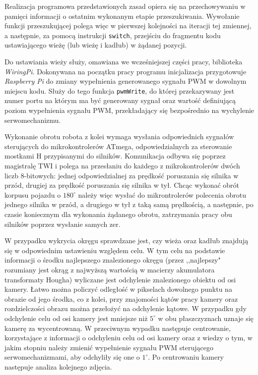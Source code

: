 Realizacja programowa przedstawionych zasad opiera się na przechowywaniu w pamięci informacji o ostatnim wykonanym etapie przeszukiwania. Wywołanie funkcji przeszukującej polega więc w pierwszej kolejności na iteracji tej zmiennej, a następnie, za pomocą instrukcji \texttt{switch}, przejściu do fragmentu kodu ustawiającego wieżę (lub wieżę i kadłub) w żądanej pozycji.

Do ustawiania wieży służy, omawiana we wcześniejszej części pracy, biblioteka \textit{WiringPi}. Dokonywana na początku pracy programu inicjalizacja przygotowuje \textit{Raspberry Pi} do zmiany wypełnienia generowanego sygnału PWM w dowolnym miejscu kodu.  Służy do tego funkcja \texttt{pwmWrite}, do której przekazywany jest numer portu na którym ma być generowany sygnał oraz wartość definiującą poziom wypełnienia sygnału PWM, przekładający się bezpośrednio na wychylenie serwomechanizmu.

Wykonanie obrotu robota z kolei wymaga wysłania odpowiednich sygnałów sterujących do mikrokontrolerów ATmega, odpowiedzialnych za sterowanie mostkami H przypisanymi do silników. Komunikacja odbywa się poprzez magistralę TWI i polega na przesłaniu do każdego z mikrokontrolerów dwóch liczb 8-bitowych: jednej odpowiedzialnej za prędkość poruszania się silnika w przód, drugiej za prędkość poruszania się silnika w tył. Chcąc wykonać obrót korpusu pojazdu o $180^\circ$ należy więc wysłać do mikrontrolerów polecenia obrotu jednego silnika w przód, a drugiego w tył z taką samą prędkością, a następnie, po czasie koniecznym dla wykonania żądanego obrotu, zatrzymania pracy obu silników poprzez wysłanie samych zer.

W przypadku wykrycia okręgu sprawdzane jest, czy wieża oraz kadłub znajdują się w odpowiednim ustawieniu względem celu. W tym celu na podstawie informacji o środku najlepszego znalezionego okręgu (przez ,,najlepszy" rozumiany jest okrąg z najwyższą wartością w macierzy akumulatora transformaty Hougha) wyliczane jest odchylenie znalezionego obiektu od osi kamery. Łatwo można policzyć odległość w pikselach dowolnego punktu na obrazie od jego środka, co z kolei, przy znajomości kątów pracy kamery oraz rozdzielczości obrazu można przełożyć na odchylenie kątowe. W przypadku gdy odchylenie celu od osi kamery jest mniejsze niż $5^\circ$ w obu płaszczyznach uznaje się kamerę za wycentrowaną. W przeciwnym wypadku następuje centrowanie, korzystające z informacji o odchyleniu celu od osi kamery oraz z wiedzy o tym, w jakim stopniu należy zmienić wypełnienie sygnału PWM sterującego serwomechanizmami, aby odchyliły się one o $1^\circ$. Po centrowaniu kamery następuje analiza kolejnego zdjęcia.

